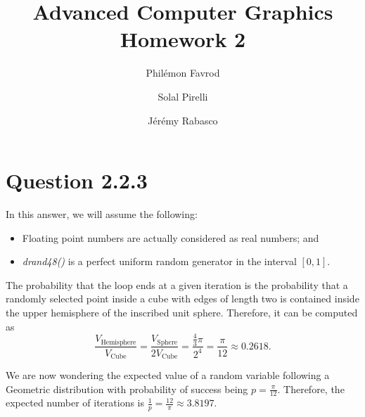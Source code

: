 \documentclass{article}
\title{Advanced Computer Graphics\\Homework 2}
\author{Phil\'emon Favrod \and Solal Pirelli \and J\'er\'emy Rabasco}
\begin{document}
\maketitle

\section{Question 2.2.3}
In this answer, we will assume the following:
\begin{itemize}
\item Floating point numbers are actually considered as real numbers; and
\item \textit{drand48()} is a perfect uniform random generator in the interval $[0, 1]$.
\end{itemize}
The probability that the loop ends at a given iteration is the probability that a randomly selected point inside a cube with edges of length two is contained inside the upper hemisphere of the inscribed unit sphere. Therefore, it can be computed as
$$
\frac{V_{\text{Hemisphere}}}{V_{\text{Cube}}} = \frac{V_{\text{Sphere}}}{2V_{\text{Cube}}} = \frac{\frac{4}{3}\pi}{2^4} = \frac{\pi}{12} \approx 0.2618. 
$$

We are now wondering the expected value of a random variable following a Geometric distribution with probability of success being $p = \frac{\pi}{12}$. Therefore,
the expected number of iterations is $\frac 1p = \frac{12}{\pi} \approx 3.8197$.
\end{document}
